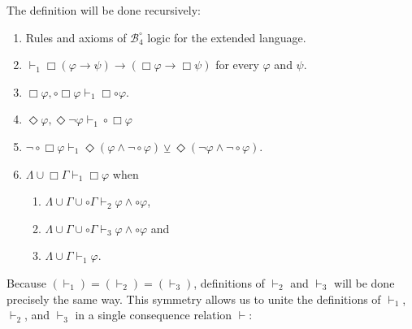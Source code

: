 \documentclass{amsart}
\newcommand{\so}{\rightarrow}
\newcommand{\B}{$\mathcal{B}_4^\circ$}
\begin{document}
The definition will be done recursively:


\begin{enumerate}
    \item Rules and axioms of \B \; logic for the extended language.
    \item $\vdash_1 \Box (\varphi \so \psi) \so (\Box \varphi \so \Box \psi)$ for every $\varphi$ and $\psi$.
    \item $\Box \varphi, \circ \Box \varphi \vdash_1 \Box \circ \varphi$.
    \item $\Diamond \varphi, \Diamond \lnot \varphi \vdash_1 \circ \Box \varphi$
    \item $\lnot \circ \Box \varphi \vdash_1 \Diamond (\varphi \land \lnot \circ \varphi) \veebar \Diamond (\lnot \varphi \land \lnot \circ \varphi)$.
    \item $\Lambda \cup \Box \Gamma \vdash_1 \Box \varphi$ when 
        \begin{enumerate}
            \item $\Lambda \cup \Gamma \cup \circ \Gamma \vdash_2 \varphi \land \circ \varphi$,
            \item $\Lambda \cup \Gamma \cup \circ \Gamma \vdash_3 \varphi \land \circ \varphi$ and
            \item $\Lambda \cup \Gamma \vdash_1 \varphi$.
        \end{enumerate}
\end{enumerate}

    Because $(\vdash_1) = (\vdash_2) = (\vdash_3)$, definitions of $\vdash_2$ and $\vdash_3$ will be done precisely the same way. This symmetry allows us to unite the definitions of $\vdash_1$, $\vdash_2$, and $\vdash_3$ in a single consequence relation $\vdash$:
\end{document}
